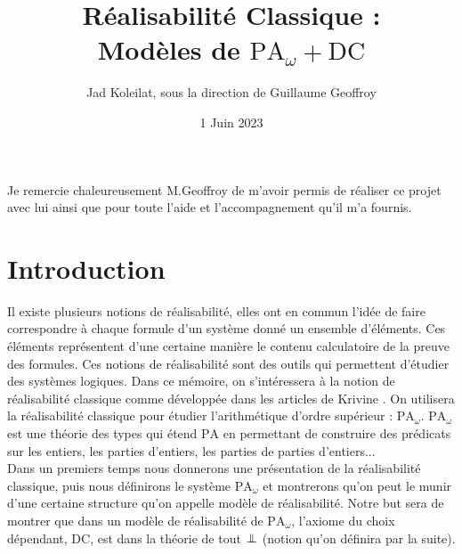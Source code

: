 \documentclass[a4paper,12pt]{article}
\theoremstyle{rmqstyle}
\newcommand{\PA}{\mathrm{PA}}
\newcommand{\pole}{{\protect\mathpalette{\protect\polehelper}{\bot}}} \def\polehelper#1#2{\mathrel{\rlap{$#1#2$}\mkern3mu{#1#2}}}
\newcommand{\DC}{\mathrm{DC}}
\begin{document}

\begin{titlepage}
\title{Réalisabilité Classique :\\
Modèles de $\PA_\omega + \DC$} 
\author{Jad Koleilat, sous la direction de Guillaume Geoffroy}
\date{1 Juin 2023}
\maketitle
{}
\thispagestyle{empty}
\end{titlepage}

\vspace*{\fill}
Je remercie chaleureusement M.Geoffroy de m'avoir permis de réaliser ce projet avec lui ainsi que pour toute l'aide et l'accompagnement qu'il m'a fournis.
\vspace*{\fill}
\thispagestyle{empty}
\clearpage

\tableofcontents
\thispagestyle{empty}


\clearpage


\setcounter{secnumdepth}{0}

\section{Introduction}
\label{introduction}

Il existe plusieurs notions de réalisabilité, elles ont en commun l'idée de faire correspondre à chaque formule d'un système donné un ensemble d'éléments. Ces éléments représentent d'une certaine manière le contenu calculatoire de la preuve des formules. Ces notions de réalisabilité sont des outils qui permettent d'étudier des systèmes logiques. Dans ce mémoire, on s'intéressera à la notion de réalisabilité classique comme développée dans les articles de Krivine \cite{KrivineRC} \cite{KrivineRA2}. On utilisera la réalisabilité classique pour étudier l'arithmétique d'ordre supérieur : $\PA_\omega$. $\PA_\omega$ est une théorie des types qui étend $\PA$ en permettant de construire des prédicats sur les entiers, les parties d'entiers, les parties de parties d'entiers...\\

Dans un premiers temps nous donnerons une présentation de la réalisabilité classique, puis nous définirons le système $\PA_\omega$ et montrerons qu'on peut le munir d'une certaine structure qu'on appelle modèle de réalisabilité. Notre but sera de montrer que dans un modèle de réalisabilité de $\PA_\omega$, l'axiome du choix dépendant, $\DC$, est dans la théorie de tout $\pole$ (notion qu'on définira par la suite).\\
\end{document}
